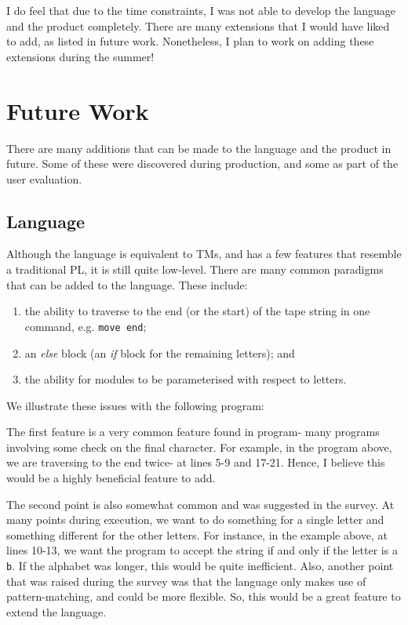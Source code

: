 I do feel that due to the time constraints, I was not able to develop the language and the product completely. There are many extensions that I would have liked to add, as listed in future work. Nonetheless, I plan to work on adding these extensions during the summer!

\section{Future Work}

There are many additions that can be made to the language and the product in future. Some of these were discovered during production, and some as part of the user evaluation.

\subsection{Language}
Although the language is equivalent to TMs, and has a few features that resemble a traditional PL, it is still quite low-level. There are many common paradigms that can be added to the language. These include:
\begin{enumerate}
    \item the ability to traverse to the end (or the start) of the tape string in one command, e.g. \texttt{move end}; 
    \item an \textit{else} block (an \textit{if} block for the remaining letters); and
    \item the ability for modules to be parameterised with respect to letters.
\end{enumerate}
We illustrate these issues with the following program:


The first feature is a very common feature found in program- many programs involving some check on the final character. For example, in the program above, we are traversing to the end twice- at lines 5-9 and 17-21. Hence, I believe this would be a highly beneficial feature to add.

The second point is also somewhat common and was suggested in the survey. At many points during execution, we want to do something for a single letter and something different for the other letters. For instance, in the example above, at lines 10-13, we want the program to accept the string if and only if the letter is a \texttt{b}. If the alphabet was longer, this would be quite inefficient. Also, another point that was raised during the survey was that the language only makes use of pattern-matching, and could be more flexible. So, this would be a great feature to extend the language. 

